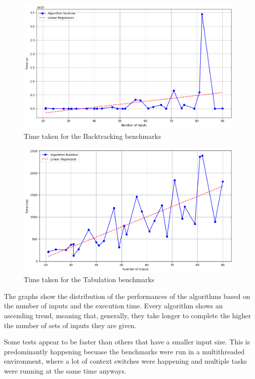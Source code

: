 \documentclass{llncs}
\begin{document}
\begin{figure}[h]
    \centering
    \includegraphics[width=\textwidth]{img/backtracking.png}
    \caption{Time taken for the Backtracking benchmarks}
    \label{fig:backtracking}
\end{figure}

\begin{figure}[h]
    \centering
    \includegraphics[width=\textwidth]{img/tabulation.png}
    \caption{Time taken for the Tabulation benchmarks}
    \label{fig:tabulation}
\end{figure}
\clearpage

The graphs show the distribution of the performances of the algorithms
based on the number of inputs and the execution time. Every algorithm shows
an ascending trend, meaning that, generally, they take longer to complete
the higher the number of sets of inputs they are given.

Some tests appear to be faster than others that have a smaller input size.
This is predominantly happening becuase the benchmarks were run in a multithreaded
environment, where a lot of context switches were happening and multiple tasks were
running at the same time anyways.
\end{document}
